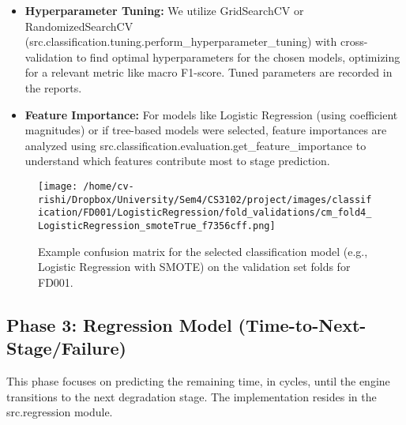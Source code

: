 \begin{itemize}
\begin{itemize}
		      \item Per-class Precision, Recall, and F1-score, with particular focus on Stages 3 and 4.
		      \item Macro and Weighted F1-scores for overall performance assessment.
		      \item Confusion Matrices (src.classification.evaluation.plot\_confusion\_matrix) to visualize inter-stage misclassifications (\cref{fig:confusion_matrix}).
	      \end{itemize}
	\item \textbf{Hyperparameter Tuning:} We utilize GridSearchCV or RandomizedSearchCV (src.classification.tuning.perform\_hyperparameter\_tuning) with cross-validation to find optimal hyperparameters for the chosen models, optimizing for a relevant metric like macro F1-score. Tuned parameters are recorded in the reports.
	\item \textbf{Feature Importance:} For models like Logistic Regression (using coefficient magnitudes) or if tree-based models were selected, feature importances are analyzed using src.classification.evaluation.get\_feature\_importance to understand which features contribute most to stage prediction.
\end{itemize}

\begin{figure}[t]
	\centering
	\texttt{[image: /home/cv-rishi/Dropbox/University/Sem4/CS3102/project/images/classification/FD001/LogisticRegression/fold\_validations/cm\_fold4\_LogisticRegression\_smoteTrue\_f7356cff.png]}
	\caption{Example confusion matrix for the selected classification model (e.g., Logistic Regression with SMOTE) on the validation set folds for FD001.}
	\label{fig:confusion_matrix}
\end{figure}

\subsection{Phase 3: Regression Model (Time-to-Next-Stage/Failure)}
\label{subsec:regression}
This phase focuses on predicting the remaining time, in cycles, until the engine transitions to the next degradation stage. The implementation resides in the src.regression module.

